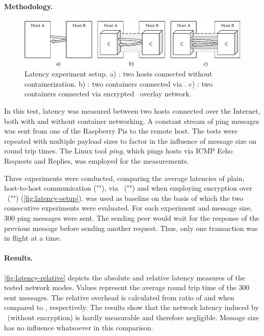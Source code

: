 \paragraph{Methodology.} 

\begin{figure}[htpb]
  \centering
  \includegraphics[width=\textwidth]{figures/ping-test}
  \caption[Latency experiment setup]{Latency experiment setup. a) : two hosts connected without containerization. b) : two containers connected via \wnet . c) : two containers connected via encrypted \wnet\ overlay network.}\label{fig:latency-setup}
\end{figure}

In this test, latency was measured between two hosts connected over the Internet, both with and without container networking. A constant stream of ping messages was sent from one of the Raspberry Pis to the remote host. The tests were repeated with multiple payload sizes to factor in the influence of message size on round trip times. The Linux tool \emph{ping}, which pings hosts via ICMP Echo Requests and Replies, was employed for the measurements. 

Three experiments were conducted, comparing the average latencies of plain, host-to-host communication (""), via \wnet\ ("") and when employing encryption over \wnet\ ("") (\cf \autoref{fig:latency-setup}).  was used as baseline on the basis of which the two consecutive experiments were evaluated. For each experiment and message size, 300 ping messages were sent. The sending peer would wait for the response of the previous message before sending another request. Thus, only one transaction was in flight at a time.


\paragraph{Results.} 

\autoref{fig:latency-relative} depicts the absolute and relative latency measures of the tested network modes. Values represent the average round trip time of the 300 sent messages. The relative overhead is calculated from ratio of  and  when compared to , respectively. The results show that the network latency induced by \wnet\ (without encryption) is hardly measurable and therefore negligible. Message size has no influence whatsoever in this comparison. 


